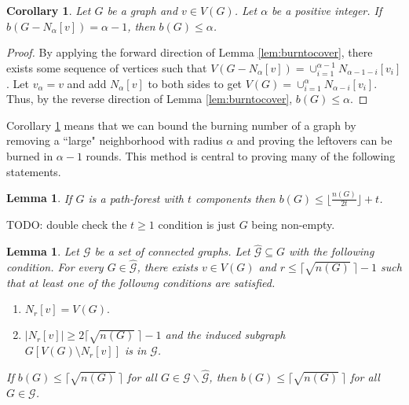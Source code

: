 \documentclass[12pt]{article}
\newtheorem{lemma}[theorem]{Lemma}
\newtheorem{corollary}[theorem]{Corollary}
\begin{document}
\begin{corollary} \label{cor:leftovers}
    Let $G$ be a graph and $v \in V(G)$.
    Let $\alpha$ be a positive integer.
    If $b(G - N_\alpha[v]) = \alpha - 1$, then $b(G) \leq \alpha$.
\end{corollary}

\begin{proof}
    By applying the forward direction of Lemma \ref{lem:burntocover}, there exists some sequence of vertices such that $V(G-N_\alpha[v]) = \cup_{i=1}^{\alpha-1} N_{\alpha-1-i}[v_i]$.
    Let $v_\alpha = v$ and add $N_{\alpha}[v]$ to both sides to get $V(G) = \cup_{i=1}^\alpha N_{\alpha - i}[v_i]$.
    Thus, by the reverse direction of Lemma \ref{lem:burntocover}, $b(G) \leq \alpha$.
\end{proof}

Corollary \ref{cor:leftovers} means that we can bound the burning number of a graph by removing a ``large" neighborhood with radius $\alpha$ and proving the leftovers can be burned in $\alpha - 1$ rounds.
This method is central to proving many of the following statements.

\begin{lemma} \label{lem:path_forest}
    If $G$ is a path-forest with $t$ components then $b(G) \leq \lfloor \frac{n(G)}{2t} \rfloor + t$.
\end{lemma}
TODO: double check the $t \geq 1$ condition is just $G$ being non-empty.


\begin{lemma} \label{lem:family}
    Let $\mathcal{G}$ be a set of connected graphs.
    Let $\hat{\mathcal{G}} \subseteq G$ with the following condition.
    For every $G \in \hat{\mathcal{G}}$, there exists $v \in V(G)$ and $r \leq \lceil \sqrt{n(G)}\ \rceil - 1$ such that at least one of the followng conditions are satisfied.
    \begin{enumerate}
        \item $N_r[v] = V(G).$
        \item $|N_r[v]| \geq 2\lceil \sqrt{n(G)}\ \rceil - 1$ and the induced subgraph\\ $G[V(G) \setminus N_r[v]]$ is in  $\mathcal{G}$.
    \end{enumerate}
    If $b(G) \leq \lceil \sqrt{n(G)}\ \rceil$ for all $G \in \mathcal{G} \backslash \hat{\mathcal{G}}$, then $b(G) \leq \lceil \sqrt{n(G)}\ \rceil$ for all $G \in \mathcal{G}$.
\end{lemma}
\end{document}
